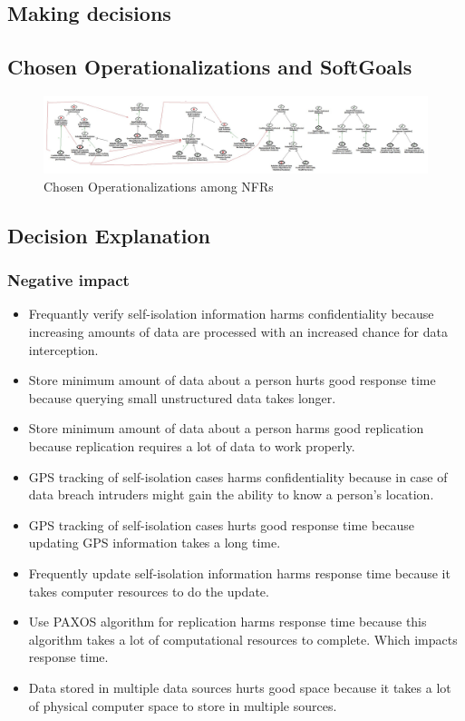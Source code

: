 \documentclass{VUMIFPSkursinis}
\begin{document}
\begin{landscape}
\section{Making decisions}
\subsection{Chosen Operationalizations and SoftGoals}
	\begin{figure}[H]
		\center
		\includegraphics[scale=0.3]{StarUML/Chosen-Operationalizations}
		\caption{Chosen Operationalizations among NFRs} %
		\label{img:kurimoProcesas}
	\end{figure}
\end{landscape}
\subsection{Decision Explanation}
	\subsubsection{Negative impact}
		\begin{itemize}
			\item{Frequantly verify self-isolation information harms confidentiality because increasing amounts of data are processed with an increased chance for data interception.}
			\item{Store minimum amount of data about a person hurts good response time because querying small unstructured data takes longer.}
			\item{Store minimum amount of data about a person harms good replication because replication requires a lot of data to work properly.}
			\item{GPS tracking of self-isolation cases harms confidentiality because in case of data breach intruders might gain the ability to know  a person's location.}
			\item{GPS tracking of self-isolation cases hurts good response time because updating GPS information takes a long time.}
			\item{Frequently update self-isolation information harms response time because it takes computer resources to do the update.}
			\item{Use PAXOS algorithm for replication harms response time because this algorithm takes a lot of computational resources to complete. Which impacts response time.}
			\item{Data stored in multiple data sources hurts good space because it takes a lot of physical computer space to store in multiple sources.}
		\end{itemize}
\end{document}
